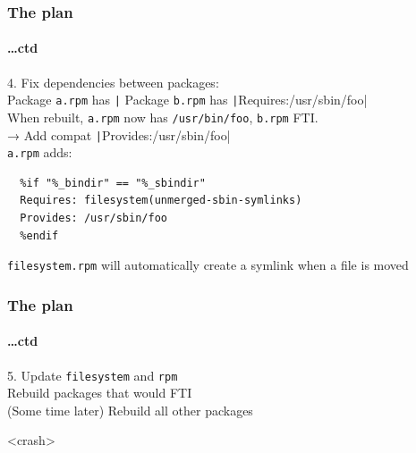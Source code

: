 \documentclass[]{beamer}
\newcommand\pp{}
\begin{document}
\begin{frame}[fragile]
  \frametitle{The plan}
  \framesubtitle{…ctd}

  4. Fix dependencies between packages:\\

   Package \texttt{a.rpm} has \texttt|%
   Package \texttt{b.rpm} has \texttt|Requires:/usr/sbin/foo|\\
   When rebuilt, \texttt{a.rpm} now has \texttt{/usr/bin/foo}, \texttt{b.rpm} FTI.
   \\\pp

   → Add compat \texttt|Provides:/usr/sbin/foo|\\

   \texttt{a.rpm} adds:
  \begin{verbatim}
  %if "%_bindir" == "%_sbindir"
  Requires: filesystem(unmerged-sbin-symlinks)
  Provides: /usr/sbin/foo
  %endif
  \end{verbatim}

  \texttt{filesystem.rpm} will automatically create a symlink when a file is moved

  \hfill
\end{frame}

\begin{frame}[fragile]
  \frametitle{The plan}
  \framesubtitle{…ctd}

  5. Update \texttt{filesystem} and \texttt{rpm}\\
  Rebuild packages that would FTI\\
  (Some time later) Rebuild all other packages
   \\\pp

   \hfill

   <crash>

  \hfill

\end{frame}
\end{document}
